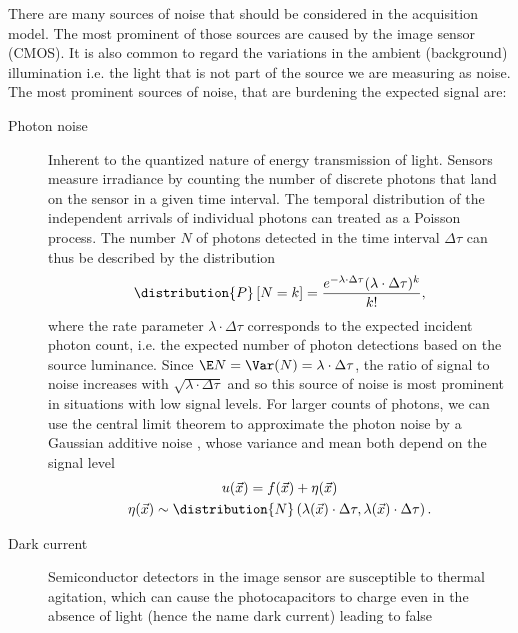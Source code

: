 There are many sources of noise that should be considered in the acquisition model.
The most prominent of those sources are caused by the image sensor (\ac{CMOS}). %
It is also common to regard the variations in the ambient (background) illumination i.e. the light that is not part of 
    the source we are measuring as noise.
The most prominent sources of noise, that are burdening the expected signal are:
\begin{description}
    \item[Photon noise]
        Inherent to the quantized nature of energy transmission of light. 
        Sensors measure irradiance by counting the number of discrete photons that land on the sensor in a given time
            interval. 
        The temporal distribution of the independent arrivals of individual photons can treated as a Poisson process.
        The number \(N\) of photons detected in the time interval \(\Delta\tau\) can thus be described by the
            distribution
            \begin{equation*}
                \distribution{P}\left[ N = k \right] = \frac{e^{-\lambda\cdot\Delta\tau}(\lambda\cdot\Delta\tau)^k}{k!},
            \end{equation*}
            where the rate parameter \(\lambda\cdot\Delta\tau\) corresponds to the expected incident photon count, i.e.
            the expected number of photon detections based on the source luminance.
        Since \(\E N = \Var(N) = \lambda\cdot\Delta\tau\), the ratio of signal to noise increases with
            \(\sqrt{\lambda\cdot\Delta\tau}\) and so this source of noise is most prominent in
            situations with low signal levels.
        For larger counts of photons, we can use the central limit theorem to approximate the photon noise by a Gaussian
            additive noise , whose variance and mean both depend on the signal level
            \begin{gather*}
                u(\vec{x}) = f(\vec{x}) + \eta(\vec{x}) \\
                \eta(\vec{x}) \sim \distribution{N}\left(\lambda(\vec{x})\cdot\Delta\tau, 
                                                         \lambda(\vec{x})\cdot\Delta\tau \right).
            \end{gather*}
    \item[Dark current]
        Semiconductor detectors in the image sensor are susceptible to thermal agitation, which can cause the
            photocapacitors to charge even in the absence of light (hence the name dark current) leading to false

\end{description}
